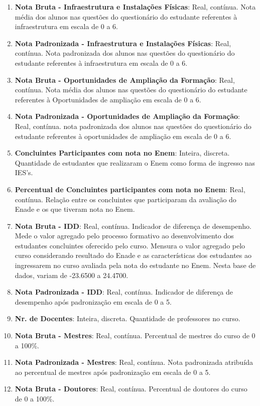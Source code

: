\begin{enumerate}
	\item \textbf{Nota Bruta - Infraestrutura e Instalações Físicas}: Real, contínua. Nota média dos alunos nas questões do questionário do estudante referentes à infraestrutura em escala de 0 a 6.
	\item \textbf{Nota Padronizada - Infraestrutura e Instalações Físicas}: Real, contínua. Nota padronizada dos alunos nas questões do questionário do estudante referentes à infraestrutura em escala de 0 a 6.
	\item \textbf{Nota Bruta - Oportunidades de Ampliação da Formação}: Real, contínua. Nota média dos alunos nas questões do questionário do estudante referentes à Oportunidades de ampliação em escala de 0 a 6.
	\item \textbf{Nota Padronizada - Oportunidades de Ampliação da Formação}: Real, contínua. nota padronizada dos alunos nas questões do questionário do estudante referentes à oportunidades de ampliação em escala de 0 a 6.
	\item \textbf{Concluintes Participantes com nota no Enem}: Inteira, discreta. Quantidade de estudantes que realizaram o Enem como forma de ingresso nas IES's.
	\item \textbf{Percentual de Concluintes participantes com nota no Enem}: Real, contínua. Relação entre os concluintes que participaram da avaliação do Enade e os que tiveram nota no Enem.
	\item \textbf{Nota Bruta - IDD}: Real, contínua. Indicador de diferença de desempenho. Mede o valor agregado pelo processo formativo ao desenvolvimento dos estudantes concluintes oferecido pelo curso. Mensura o valor agregado pelo curso  considerando resultado do Enade e as características dos estudantes ao ingressarem no curso avaliada pela nota do estudante no Enem. Nesta base de dados, variam de -23.6500 a 24.4700.
	\item \textbf{Nota Padronizada - IDD}: Real, contínua. Indicador de diferença de desempenho após padronização em escala de 0 a 5.
	\item \textbf{Nr. de Docentes}: Inteira, discreta. Quantidade de professores no curso.
	\item \textbf{Nota Bruta - Mestres}: Real, contínua. Percentual de mestres do curso de 0 a 100\%.
	\item \textbf{Nota Padronizada - Mestres}: Real, contínua. Nota padronizada atribuída ao percentual de mestres após padronização em escala de 0 a 5.
	\item \textbf{Nota Bruta - Doutores}: Real, contínua. Percentual de doutores do curso de 0 a 100\%.

\end{enumerate}
